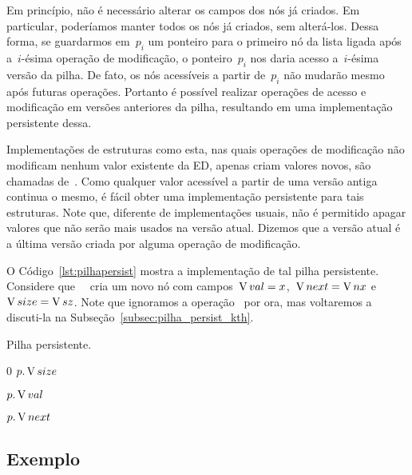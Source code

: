 \documentclass[main.tex]{subfiles}
\begin{document}
Em princípio, não é necessário alterar os campos dos nós já criados. Em particular, poderíamos manter todos os nós já criados, sem alterá-los. Dessa forma, se guardarmos em~$p_i$ um ponteiro para o primeiro nó da lista ligada após a~$i$-ésima operação de modificação, o ponteiro~$p_i$ nos daria acesso a~$i$-ésima versão da pilha. De fato, os nós acessíveis a partir de~$p_i$ não mudarão mesmo após futuras operações. Portanto é possível realizar operações de acesso e modificação em versões anteriores da pilha, resultando em uma implementação persistente dessa.

Implementações de estruturas como esta, nas quais operações de modificação não modificam nenhum valor existente da ED, apenas criam valores novos, são chamadas de~. Como qualquer valor acessível a partir de uma versão antiga continua o mesmo, é fácil obter uma implementação persistente para tais estruturas. Note que, diferente de implementações usuais, não é permitido apagar valores que não serão mais usados na versão atual. Dizemos que a versão atual é a última versão criada por alguma operação de modificação.

O Código~\ref{lst:pilhapersist} mostra a implementação de tal pilha persistente. Considere que~{~} cria um novo nó com campos~$\operatorname{V}{val} = x$,~$\operatorname{V}{next} = \operatorname{V}{nx}$ e~$\operatorname{V}{size} = \operatorname{V}{sz}$. Note que ignoramos a operação~ por ora, mas voltaremos a discuti-la na Subseção~\ref{subsec:pilha_persist_kth}.


\begin{algorithm}
\caption{Pilha persistente.} \label{lst:pilhapersist}
\begin{algorithmic}[1]

	\State \Return \Null
\EndFunction

		\State \Return $0$
	\Else
		\State \Return $p.\operatorname{V}{size}$
	\EndIf
\EndFunction

	\State \Return \New {}
\EndFunction

	\State \Return $p.\operatorname{V}{val}$
\EndFunction

	\State \Return $p.\operatorname{V}{next}$
\EndFunction

\end{algorithmic}
\end{algorithm}

\subsection{Exemplo}
\end{document}

